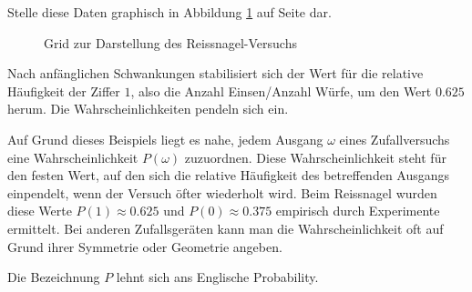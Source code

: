 \documentclass[%
11pt,%
twoside,%
titlepage,%
german,%
headsepline%
]{scrartcl}
\newcommand{\faEyeLightGray}{\textcolor{lightgray}{\faEye}} %
\newcommand{\concatueb}[1]{ueb:#1}%
\newcommand{\concatlsg}[1]{lsg:#1}%
\newcommand{\uebh}[2]{%
  \begin{ueb}\label{\concatueb{#1}} %
    #2
    \hfill\hyperref[\concatlsg{#1}]{\faEyeLightGray}
  \end{ueb}%
}
\begin{document}
\uebh{reissnagel}{
Stelle diese Daten graphisch in Abbildung \ref{graph} auf Seite \pageref{graph} dar.
}

\begin{figure}
\centering
{}
\caption{Grid zur Darstellung des Reiss\-nagel-\-Versuchs}\label{graph}
\end{figure}

Nach anfänglichen Schwankungen stabilisiert sich der Wert für die relative Häufigkeit der Ziffer $1$, also die Anzahl Einsen/Anzahl Würfe, um den Wert $0.625$ herum. Die Wahrscheinlichkeiten \glqq pendeln sich ein\grqq.

Auf Grund dieses Beispiels liegt es nahe, jedem Ausgang $\omega$ eines Zufallversuchs eine Wahrscheinlichkeit $P(\omega)$ zuzuordnen. Diese Wahrscheinlichkeit steht für den festen Wert, auf den sich die relative Häufigkeit des betreffenden Ausgangs einpendelt, wenn der Versuch öfter wiederholt wird. Beim Reissnagel wurden diese Werte $P(1)\approx0.625$ und $P(0)\approx0.375$ empirisch durch Experimente ermittelt. Bei anderen Zufallsgeräten kann man die Wahrscheinlichkeit oft auf Grund ihrer Symmetrie oder Geometrie angeben.

\begin{bem}
Die Bezeichnung $P$ lehnt sich ans Englische Probability.
\end{bem}
\end{document}
